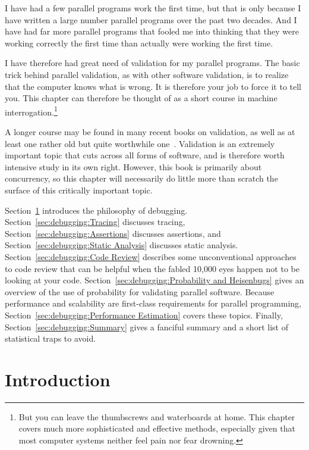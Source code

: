 

I have had a few parallel programs work the first time, but that is only
because I have written a large number parallel programs over the past two
decades.
And I have had far more parallel programs that fooled me into thinking
that they were working correctly the first time than actually were working
the first time.

I have therefore had great need of validation for my parallel programs.
The basic trick behind parallel validation, as with other software
validation, is to realize that the computer knows what is wrong.
It is therefore your job to force it to tell you.
This chapter can therefore be thought of as a short course in
machine interrogation.\footnote{
	But you can leave the thumbscrews and waterboards at home.
	This chapter covers much more sophisticated and effective
	methods, especially given that most computer
	systems neither feel pain nor fear drowning.}

A longer course may be found in many recent books on validation, as
well as at least one rather old but quite worthwhile
one~\cite{GlenfordJMyers1979}.
Validation is an extremely important topic that cuts across all forms
of software, and is therefore worth intensive study in its own right.
However, this book is primarily about concurrency, so this chapter
will necessarily do little more than scratch the surface of this
critically important topic.

Section~\ref{sec:debugging:Introduction}
introduces the philosophy of debugging.
Section~\ref{sec:debugging:Tracing}
discusses tracing,
Section~\ref{sec:debugging:Assertions}
discusses assertions, and
Section~\ref{sec:debugging:Static Analysis}
discusses static analysis.
Section~\ref{sec:debugging:Code Review}
describes some unconventional approaches to code review that can
be helpful when the fabled 10,000 eyes happen not to be looking at your code.
Section~\ref{sec:debugging:Probability and Heisenbugs}
gives an overview of the use of probability for validating parallel software.
Because performance and scalability are first-class requirements
for parallel programming,
Section~\ref{sec:debugging:Performance Estimation} covers these
topics.
Finally,
Section~\ref{sec:debugging:Summary}
gives a fanciful summary and a short list of statistical traps to avoid.

\section{Introduction}
\label{sec:debugging:Introduction}

